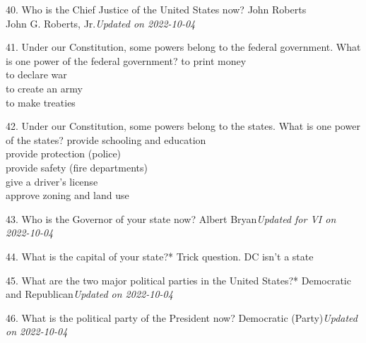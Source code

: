 \documentclass[avery5371,frame]{flashcards}
\begin{document}
        \begin{flashcard}{40. Who is the Chief Justice of the United States now?}
        {John Roberts\\John G. Roberts, Jr.{\footnotesize{\textsl{Updated on 2022-10-04}}}}
        \end{flashcard}
        \begin{flashcard}{41. Under our Constitution, some powers belong to the federal government. What is one power of the federal government?}
        {to print money\\to declare war\\to create an army\\to make treaties}
        \end{flashcard}
        \begin{flashcard}{42. Under our Constitution, some powers belong to the states. What is one power of the states?}
        {provide schooling and education\\provide protection (police)\\provide safety (fire departments)\\give a driver’s license\\approve zoning and land use}
        \end{flashcard}
        \begin{flashcard}{43. Who is the Governor of your state now?}
        {Albert Bryan{\footnotesize{\textsl{Updated for VI on 2022-10-04}}}}
        \end{flashcard}
        \begin{flashcard}{44. What is the capital of your state?*}
        {Trick question. DC isn't a state}
        \end{flashcard}
        \begin{flashcard}{45. What are the two major political parties in the United States?*}
        {Democratic and Republican{\footnotesize{\textsl{Updated on 2022-10-04}}}}
        \end{flashcard}
        \begin{flashcard}{46. What is the political party of the President now?}
        {Democratic (Party){\footnotesize{\textsl{Updated on 2022-10-04}}}}
        \end{flashcard}
\end{document}
